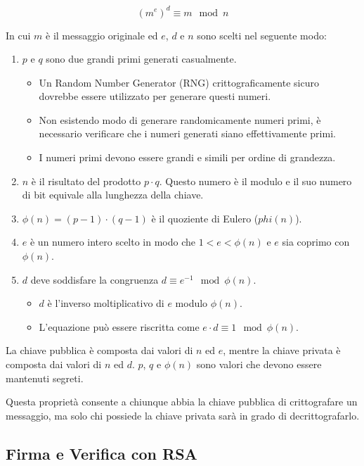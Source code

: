 $$(m^e)^d \equiv m \mod n$$

\noindent In cui $m$ è il messaggio originale ed $e$, $d$ e $n$ sono scelti nel seguente modo:
\begin{enumerate}
	\item $p$ e $q$ sono due grandi primi generati casualmente.
	      \begin{itemize}
		      \item Un Random Number Generator (RNG) crittograficamente sicuro dovrebbe essere utilizzato per generare questi numeri.
		      \item Non esistendo modo di generare randomicamente numeri primi, è necessario verificare che i numeri generati siano effettivamente primi.
		      \item I numeri primi devono essere grandi e simili per ordine di grandezza.
	      \end{itemize}
	\item $n$ è il risultato del prodotto $p \cdot q$. Questo numero è il modulo e il suo numero di bit equivale alla lunghezza della chiave.
	\item $\phi(n) = (p - 1) \cdot (q - 1)$ è il quoziente di Eulero ($phi(n)$).
	\item $e$ è un numero intero scelto in modo che $1 < e < \phi(n)$ e $e$ sia coprimo con $\phi(n)$.
	\item $d$ deve soddisfare la congruenza $d \equiv e^{-1} \mod \phi(n)$.
	      \begin{itemize}
		      \item $d$ è l'inverso moltiplicativo di $e$ modulo $\phi(n)$.
		      \item L'equazione può essere riscritta come $e \cdot d \equiv 1 \mod \phi(n)$.
	      \end{itemize}
\end{enumerate}

La chiave pubblica è composta dai valori di $n$ ed $e$, mentre la chiave privata è composta dai valori di $n$ ed $d$.
$p$, $q$ e $\phi(n)$ sono valori che devono essere mantenuti segreti.

Questa proprietà consente a chiunque abbia la chiave pubblica di crittografare un messaggio, ma solo chi possiede la chiave privata sarà in grado di decrittografarlo.

\subsection{Firma e Verifica con RSA}
\label{cap:rsassa}

